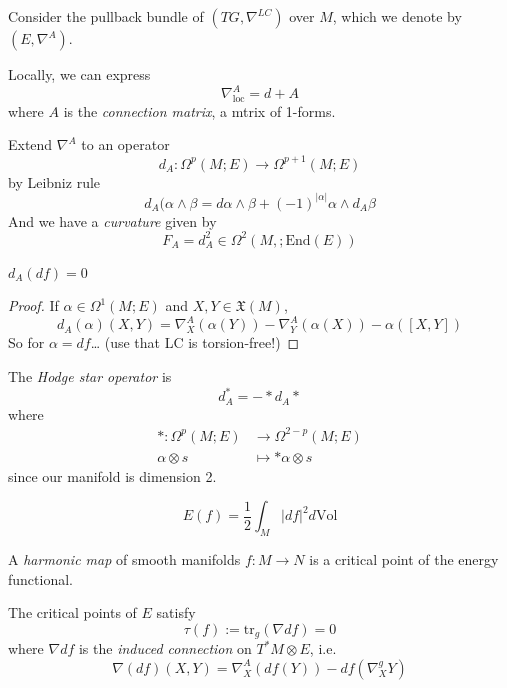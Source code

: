 Consider the pullback bundle of
$(TG,\nabla^{LC})$ over $M$, which we denote
by
$(E,\nabla^A)$.

Locally, we can express
$$
\nabla^A_{\text{loc}}=d+A
$$
where $A$ is the {\it connection matrix}, a
mtrix of 1-forms.

Extend  $\nabla^A$ to an operator
$$
d_A:\Omega^{p}(M;E)\to \Omega^{p+1}(M;E)
$$
by Leibniz rule
$$
d_A(\alpha\wedge\beta=d\alpha\wedge\beta+(-1)
^{|\alpha|}\alpha\wedge
d_A\beta
$$
And we have a {\it curvature} given by
$$
F_A=d^2_A\in\Omega^{2}(M,;\text{End}(E))
$$

\begin{lemma}
\label{lemma-derivative-of-differential}
$d_A(df)=0$
\end{lemma}

\begin{proof}
If $\alpha\in\Omega^{1}(M;E)$ and
$X,Y\in\mathfrak{X}(M)$,
$$
d_A(\alpha)(X,Y)=\nabla_X^A(\alpha(Y))-
\nabla_Y^A(\alpha(X))-\alpha([X,Y])
$$
So for $\alpha=df$… (use that LC is
torsion-free!)
\end{proof}

\begin{definition}
\label{definition-Hodge-star}
The {\it Hodge star operator} is
$$
d^*_A=-*d_A*
$$
where
$$
\begin{aligned}
*: \Omega^{p}(M;E) &\longrightarrow
\Omega^{2-p}(M;E) \\
\alpha\otimes s &\longmapsto *\alpha\otimes s
\end{aligned}
$$
since our manifold is dimension 2.
\end{definition}

\begin{definition}
\label{definition-energy-functional}
$$
E(f)=\frac{1}{2}\int_M|df|^2d\text{Vol}
$$
\end{definition}

\begin{definition}
\label{definition-harmonic-map-duplicate-2}
A {\it harmonic map} of smooth manifolds
$f:M\to N$ is a critical point of the
energy functional.
\end{definition}

\begin{lemma}
\label{lemma-criti-point-energ-funct}
The critical points of $E$ satisfy
$$
\tau(f):=\text{tr}_g(\nabla df)=0
$$
where $\nabla df$ is the {\it induced
connection} on $T^*M\otimes E$, i.e.
$$
\nabla(df)(X,Y)=\nabla_X^A(df(Y))-
df(\nabla_X^gY)
$$
\end{lemma}

